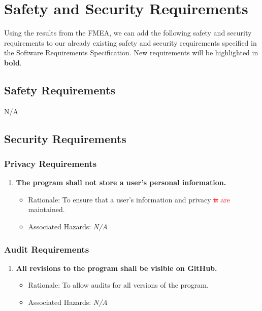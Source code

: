 \documentclass{article}
\begin{document}
\section{Safety and Security Requirements}
Using the results from the FMEA, we can add the following safety and security requirements to our already existing safety and security requirements specified in the Software Requirements Specification. New requirements will be highlighted in \textbf{bold}.
\subsection{Safety Requirements}
N/A
\subsection{Security Requirements}
\subsubsection{Privacy Requirements}
\begin{enumerate}[{PR}1. ]
\item \label{PR1} \textbf{The program shall not store a user's personal information.}
    \begin{itemize} 
        \item Rationale: To ensure that a user's information and privacy \textcolor{red}{\sout{is} are} maintained.
        \item Associated Hazards: \textit{N/A}
    \end{itemize} 
\end{enumerate}

\subsubsection{Audit Requirements}
\begin{enumerate}[{AR}1. ]
\item \label{AR1}\textbf{All revisions to the program shall be visible on GitHub.}
    \begin{itemize} 
        \item Rationale: To allow audits for all versions of the program.
         \item Associated Hazards: \textit{N/A}
    \end{itemize} 
\end{enumerate}
\end{document}
